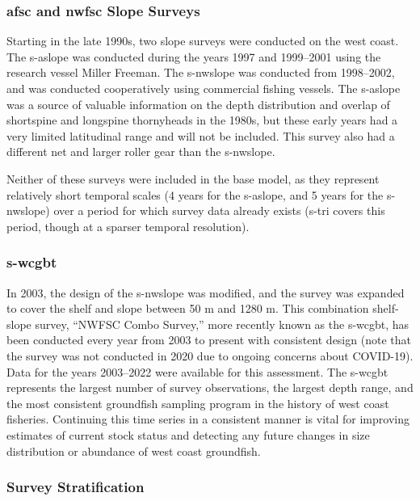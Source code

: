 \documentclass[11pt,
  english,
  letterpaper,
]{article}
\begin{document}
\hypertarget{and-slope-surveys}{%
\subsubsection{\texorpdfstring{\acrshort{afsc} and \acrshort{nwfsc} Slope Surveys}{ and  Slope Surveys}}\label{and-slope-surveys}}

Starting in the late 1990s, two slope surveys were conducted on the west coast. The \gls{s-aslope} was conducted during the years 1997 and 1999--2001 using the research vessel Miller Freeman. The \gls{s-nwslope} was conducted from 1998--2002, and was conducted cooperatively using commercial fishing vessels. The \gls{s-aslope} was a source of valuable information on the depth distribution and overlap of shortspine and longspine thornyheads in the 1980s, but these early years had a very limited latitudinal range and will not be included. This survey also had a different net and larger roller gear than the \gls{s-nwslope}.

Neither of these surveys were included in the base model, as they represent relatively short temporal scales (4 years for the \gls{s-aslope}, and 5 years for the \gls{s-nwslope}) over a period for which survey data already exists (\gls{s-tri} covers this period, though at a sparser temporal resolution).

\hypertarget{section-1}{%
\subsubsection{\texorpdfstring{\acrlong{s-wcgbt}}{}}\label{section-1}}

In 2003, the design of the \gls{s-nwslope} was modified, and the survey was expanded to cover the shelf and slope between 50 m and 1280 m. This combination shelf-slope survey, ``NWFSC Combo Survey,'' more recently known as the \gls{s-wcgbt}, has been conducted every year from 2003 to present with consistent design (note that the survey was not conducted in 2020 due to ongoing concerns about COVID-19). Data for the years 2003--2022 were available for this assessment. The \gls{s-wcgbt} represents the largest number of survey observations, the largest depth range, and the most consistent groundfish sampling program in the history of west coast fisheries. Continuing this time series in a consistent manner is vital for improving estimates of current stock status and detecting any future changes in size distribution or abundance of west coast groundfish.

\hypertarget{survey-stratification}{%
\subsubsection{Survey Stratification}\label{survey-stratification}}
\end{document}
